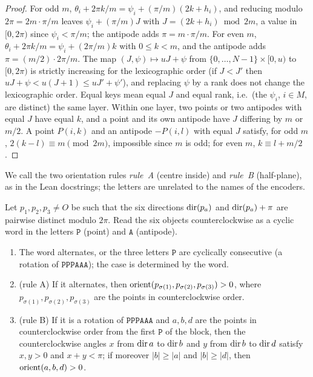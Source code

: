\begin{proof}
For odd $m$, $\theta_i+2\pi k/m=\psi_i+(\pi/m)(2k+h_i)$, and reducing modulo $2\pi=2m\cdot\pi/m$ leaves
$\psi_i+(\pi/m)J$ with $J=(2k+h_i)\bmod2m$, a value in $[0,2\pi)$ since $\psi_i<\pi/m$; the antipode adds
$\pi=m\cdot\pi/m$. For even $m$, $\theta_i+2\pi k/m=\psi_i+(2\pi/m)k$ with $0\le k<m$, and the antipode adds
$\pi=(m/2)\cdot2\pi/m$. The map $(J,\psi)\mapsto uJ+\psi$ from $\{0,\dots,N-1\}\times[0,u)$ to $[0,2\pi)$ is strictly
increasing for the lexicographic order (if $J<J'$ then $uJ+\psi<u(J+1)\le uJ'+\psi'$), and replacing $\psi$ by a rank
does not change the lexicographic order. Equal keys mean equal $J$ and equal rank, i.e.\ (the $\psi_i$, $i\in M$, are
distinct) the same layer.
Within one layer, two points or two antipodes with equal $J$ have equal $k$, and a point and its own antipode have $J$ differing by $m$ or $m/2$. A point $P(i,k)$ and an antipode
$-P(i,l)$ with equal $J$ satisfy, for odd $m$, $2(k-l)\equiv m\pmod{2m}$, impossible since $m$ is odd; for even $m$,
$k\equiv l+m/2$.
\end{proof}

We call the two orientation rules \emph{rule~A} (centre inside) and \emph{rule~B} (half-plane), as in the Lean
docstrings; the letters are unrelated to the names of the encoders.

\begin{lemma}\label{k8s:lem:dich}
Let $p_1,p_2,p_3\ne O$ be such that the six directions $\operatorname{dir}(p_a)$ and $\operatorname{dir}(p_a)+\pi$ are pairwise distinct modulo
$2\pi$. Read the six objects counterclockwise as a cyclic word in the letters $\mathtt P$ (point) and $\mathtt A$
(antipode).
\begin{enumerate}[label=(\alph*)]
\item The word alternates, or the three letters $\mathtt P$ are cyclically consecutive (a rotation of
$\mathtt{PPPAAA}$); the case is determined by the word.
\item (rule A) If it alternates, then $\operatorname{orient}(p_{\sigma(1)},p_{\sigma(2)},p_{\sigma(3)})>0$, where
$p_{\sigma(1)},p_{\sigma(2)},p_{\sigma(3)}$ are the points in counterclockwise order.
\item (rule B) If it is a rotation of $\mathtt{PPPAAA}$ and $a,b,d$ are the points in counterclockwise order from the
first $\mathtt P$ of the block, then the counterclockwise angles $x$ from $\operatorname{dir} a$ to $\operatorname{dir} b$ and $y$ from $\operatorname{dir} b$ to
$\operatorname{dir} d$ satisfy $x,y>0$ and $x+y<\pi$; if moreover $|b|\ge|a|$ and $|b|\ge|d|$, then $\operatorname{orient}(a,b,d)>0$.
\end{enumerate}
\end{lemma}

